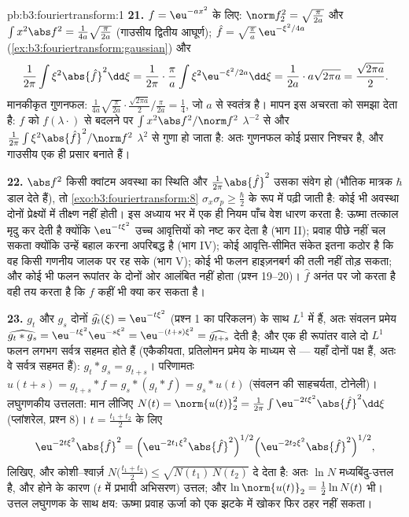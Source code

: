 \begin{solution}{pb:b3:fouriertransform:1}
\textbf{21.} $f = \eu^{-ax^2}$ के लिए: $\norm f_2^2 =
\sqrt{\frac\pi{2a}}$ और $\int x^2\abs f^2 =
\frac1{4a}\sqrt{\frac{\pi}{2a}}$ (गाउसीय द्वितीय आघूर्ण);
$\hat f = \sqrt{\frac\pi a}\,\eu^{-\xi^2/4a}$ (\cref{ex:b3:fouriertransform:gaussian}) और
\[
\frac1{2\pi}\int\xi^2\abs{\hat f}^2\dd\xi =
\frac1{2\pi}\cdot\frac\pi a\int\xi^2
\eu^{-\xi^2/2a}\dd\xi = \frac1{2a}\cdot a\sqrt{2\pi a}
= \frac{\sqrt{2\pi a}}2 .
\]
मानकीकृत गुणनफल: $\frac1{4a}\sqrt{\frac\pi{2a}}\cdot
\frac{\sqrt{2\pi a}}2\big/\frac{\pi}{2a} = \frac14$, जो $a$ से स्वतंत्र है। मापन इस अचरता को
समझा देता है: $f$ को $f(\lambda\cdot)$ से बदलने पर $\int x^2\abs f^2/\norm
f^2$ $\lambda^{-2}$ से और $\frac1{2\pi}\int\xi^2\abs{\hat
f}^2/\norm f^2$
$\lambda^{2}$ से गुणा हो जाता है: अतः गुणनफल कोई प्रसार निश्चर है, और गाउसीय
एक ही प्रसार  बनाते हैं।

\textbf{22.} $\abs f^2$ किसी क्वांटम अवस्था का स्थिति  और $\frac1{2\pi}\abs{\hat f}^2$ उसका
संवेग  हो (भौतिक मात्रक $\hbar$ डाल देते हैं), तो \cref{exo:b3:fouriertransform:8} $\sigma_x\sigma_p
\geq \frac\hbar2$ के
रूप में पढ़ी जाती है: कोई भी अवस्था दोनों प्रेक्ष्यों में तीक्ष्ण
नहीं होती। इस अध्याय भर में एक ही नियम पाँच वेश धारण करता है: ऊष्मा
तत्काल मृदु कर देती है क्योंकि $\eu^{-t\xi^2}$ उच्च आवृत्तियों को नष्ट कर देता
है (भाग II); प्रवाह पीछे नहीं चल सकता क्योंकि उन्हें बहाल करना
अपरिबद्ध है (भाग IV); कोई आवृत्ति-सीमित संकेत इतना कठोर है कि वह
किसी गणनीय जालक पर रह सके (भाग V); कोई भी फलन हाइज़नबर्ग की तली नहीं
तोड़ सकता; और कोई भी फलन रूपांतर के दोनों ओर  आलंबित नहीं होता
(प्रश्न 19--20)। $\hat f$ अनंत पर जो करता है वही तय करता है कि $f$
कहीं भी क्या कर सकता है।

\textbf{23.} $g_t$ और $g_s$ दोनों $\widehat{g_t}(\xi) = \eu^{-t\xi^2}$ (प्रश्न 1 का परिकलन) के साथ
$L^1$ में हैं, अतः संवलन प्रमेय $\widehat{g_t * g_s} = \eu^{-t\xi^2}\eu^{-s\xi^2} =
\eu^{-(t+s)\xi^2} = \widehat{g_{t+s}}$ देती है; और एक ही रूपांतर वाले
दो $L^1$ फलन लगभग सर्वत्र सहमत होते हैं (एकैकीयता, प्रतिलोमन प्रमेय
के माध्यम से --- यहाँ दोनों पक्ष  हैं, अतः वे सर्वत्र सहमत हैं):
$g_t * g_s = g_{t+s}$। परिणामतः
$u(t + s) = g_{t+s} * f = g_s * (g_t * f) = g_s * u(t)$
(संवलन की साहचर्यता, टोनेली)। लघुगणकीय उत्तलता: मान लीजिए $N(t) = \norm{u(t)}_2^2 = \frac1{2\pi}\int
\eu^{-2t\xi^2}\abs{\hat f}^2\dd\xi$
(प्लांशरेल, प्रश्न 8)। $t = \frac{t_1 + t_2}2$ के लिए
\[
\eu^{-2t\xi^2}\abs{\hat f}^2
= \Bigl(\eu^{-2t_1\xi^2}\abs{\hat f}^2\Bigr)^{1/2}
\Bigl(\eu^{-2t_2\xi^2}\abs{\hat f}^2\Bigr)^{1/2},
\]
लिखिए, और कोशी--श्वार्ज़ $N\bigl(\frac{t_1+t_2}2\bigr) \leq
\sqrt{N(t_1)\,N(t_2)}$ दे देता है: अतः $\ln N$ मध्यबिंदु-उत्तल
है, और  होने के कारण ($t$ में प्रभावी अभिसरण) उत्तल; और $\ln\norm{u(t)}_2 = \frac12\ln N(t)$
भी। उत्तल लघुगणक के साथ क्षय: ऊष्मा प्रवाह ऊर्जा को एक झटके में
खोकर फिर ठहर नहीं सकता।


\end{solution}
